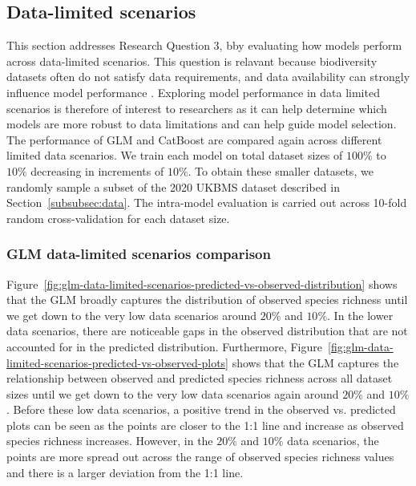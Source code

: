 \subsection{Data-limited scenarios}\label{subsec:research-question-3}
This section addresses Research Question 3, bby evaluating how models perform across data-limited scenarios. This question is relavant because biodiversity datasets often do not satisfy data requirements, and data availability can strongly influence model performance \parencite{pichler2023}. Exploring model performance in data limited scenarios is therefore of interest to researchers as it can help determine which models are more robust to data limitations and can help guide model selection. The performance of GLM and CatBoost are compared again across different limited data scenarios. We train each model on total dataset sizes of \(100\%\) to \(10\%\) decreasing in increments of \(10\%\). To obtain these smaller datasets, we randomly sample a subset of the 2020 UKBMS dataset described in Section~\ref{subsubsec:data}. The intra-model evaluation is carried out across 10-fold random cross-validation for each dataset size.

\subsubsection{GLM data-limited scenarios comparison}\label{subsubsection:glm-data-limited-scenarios}

Figure~\ref{fig:glm-data-limited-scenarios-predicted-vs-observed-distribution} shows that the GLM broadly captures the distribution of observed species richness until we get down to the very low data scenarios around \(20\%\) and \(10\%\). In the lower data scenarios, there are noticeable gaps in the observed distribution that are not accounted for in the predicted distribution. Furthermore, Figure~\ref{fig:glm-data-limited-scenarios-predicted-vs-observed-plots} shows that the GLM captures the relationship between observed and predicted species richness across all dataset sizes until we get down to the very low data scenarios again around \(20\%\) and \(10\%\). Before these low data scenarios, a positive trend in the observed vs. predicted plots can be seen as the points are closer to the 1:1 line and increase as observed species richness increases. However, in the \(20\%\) and \(10\%\) data scenarios, the points are more spread out across the range of observed species richness values and there is a larger deviation from the 1:1 line.

